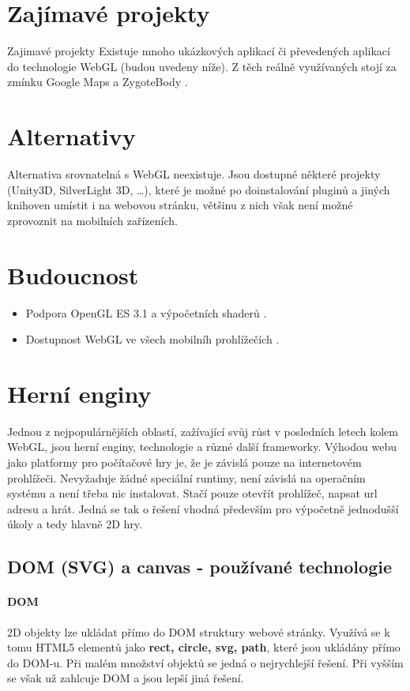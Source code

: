 \documentclass[12pt,a4paper,titlepage,final]{report}
\begin{document}
\section{Zajímavé projekty}
Zajimavé projekty
Existuje mnoho ukázkových aplikací či převedených aplikací do technologie WebGL (budou uvedeny níže). Z těch reálně využívaných stojí za zmínku Google Maps \cite{maps} a ZygoteBody \cite{zygotebody}. 

\section{Alternativy}
Alternativa srovnatelná s WebGL neexistuje. Jsou dostupné některé projekty (Unity3D, SilverLight 3D, \dots), které je možné po doinstalování pluginů a jiných knihoven umístit i na webovou stránku, většinu z nich však není možné zprovoznit na mobilních zařízeních.

\section{Budoucnost}
\begin{itemize}
	\item Podpora OpenGL ES 3.1 a výpočetních shaderů \cite{future}.
	\item Dostupnost WebGL ve všech mobilníh prohlížečích \cite{future}.	
\end{itemize}

\section{Herní enginy}

Jednou z nejpopulárnějších oblastí, zažívající svůj růst v posledních letech kolem WebGL, jsou herní enginy, technologie a různé další frameworky. Výhodou webu jako platformy pro počítačové hry je, že je závislá pouze na internetovém prohlížeči. Nevyžaduje žádné speciální runtimy, není závislá na operačním systému a není třeba nic instalovat. Stačí pouze otevřít prohlížeč, napsat url adresu a hrát. Jedná se tak o řešení vhodná především pro výpočetně jednodušší úkoly a tedy 
hlavně 2D hry.

\subsection{DOM (SVG) a canvas - používané technologie}

\paragraph{DOM} 2D objekty lze ukládat přímo do DOM struktury webové stránky. Využívá se k tomu HTML5 elementů jako \textbf{rect, circle, svg, path}, které jsou ukládány přímo do DOM-u. Při malém množství objektů se jedná o nejrychlejší řešení. Při vyšším se však už zahlcuje DOM a jsou lepší jiná řešení.
\end{document}
